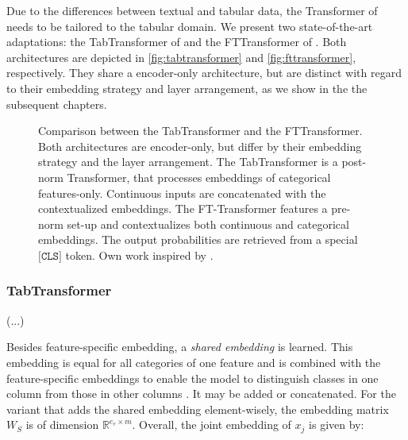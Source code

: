 Due to the differences between textual and tabular data, the Transformer of \textcite[][]{vaswaniAttentionAllYou2017} needs to be tailored to the tabular domain. We present two state-of-the-art adaptations: the TabTransformer of \textcite[][2]{huangTabTransformerTabularData2020} and the FTTransformer of \textcite[][4]{gorishniyRevisitingDeepLearning2021}. Both architectures are depicted in \cref{fig:tabtransformer} and \cref{fig:fttransformer}, respectively. They share a encoder-only architecture, but are distinct with regard to their embedding strategy and layer arrangement, as we show in the the subsequent chapters.

\begin{figure}[ht]
  \hfill%
  \caption[Comparison Between Tabular Transformer.]{Comparison between the TabTransformer and the FTTransformer. Both architectures are encoder-only, but differ by their embedding strategy and the layer arrangement. The TabTransformer is a post-norm Transformer, that processes embeddings of categorical features-only. Continuous inputs are concatenated with the contextualized embeddings. The FT-Transformer features a pre-norm set-up and contextualizes both continuous and categorical embeddings. The output probabilities are retrieved from a special $\texttt{[CLS]}$ token. Own work inspired by \textcites[][2]{huangTabTransformerTabularData2020}[][4]{gorishniyRevisitingDeepLearning2021}.}
  \label{fig:tabular-transformer}
\end{figure}

\subsubsection{TabTransformer}\label{sec:tabtransformer}

(...)


Besides feature-specific embedding, a \emph{shared embedding} is learned. This embedding is equal for all categories of one feature and is combined with the feature-specific embeddings to enable the model to distinguish classes in one column from those in other columns \autocite[][10]{huangTabTransformerTabularData2020}. It may be added or concatenated. For the variant that adds the shared embedding element-wisely, the embedding matrix $W_S$ is of dimension $\mathbb{R}^{e_e \times m}$. Overall, the joint embedding of $x_j$ is given by:

